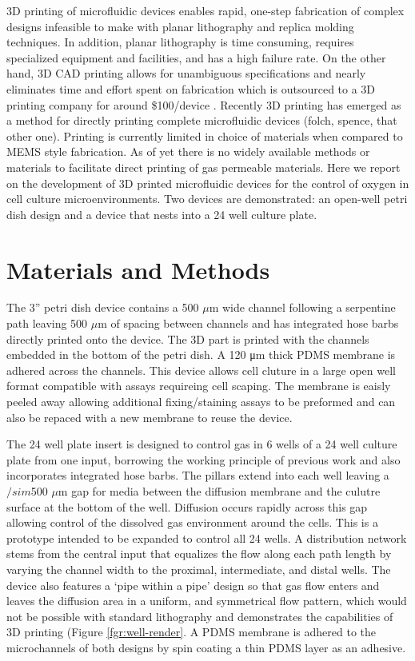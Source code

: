 3D printing of microfluidic devices enables rapid, one-step fabrication of complex designs infeasible to make with planar lithography and replica molding techniques.
In addition, planar lithography is time consuming, requires specialized equipment and facilities, and has a high failure rate.
On the other hand, 3D CAD printing allows for unambiguous specifications and nearly eliminates time and effort spent on fabrication which is outsourced to a 3D printing company for around \$100/device \cite{Au2014,Chen2014}.
Recently 3D printing has emerged as a method for directly printing complete microfluidic devices (folch, spence, that other one). 
Printing is currently limited in choice of materials when compared to MEMS style fabrication. 
As of yet there is no widely available methods or materials to facilitate direct printing of gas permeable materials.
Here we report on the development of 3D printed microfluidic devices for the control of oxygen in cell culture microenvironments.
Two devices are demonstrated: an open-well petri dish design and a device that nests into a 24 well culture plate.

\section*{Materials and Methods}

The 3” petri dish device contains a 500 $\mu$m wide channel following a serpentine path leaving 500 $\mu$m of spacing between channels and has integrated hose barbs directly printed onto the device.
The 3D part is printed with the channels embedded in the bottom of the petri dish. 
A 120 μm thick PDMS membrane is adhered across the channels.
This device allows cell cluture in a large open well format compatible with assays requireing cell scaping.
The membrane is eaisly peeled away allowing additional fixing/staining assays to be preformed and can also be repaced with a new membrane to reuse the device. 

The 24 well plate insert is designed to control gas in 6 wells of a 24 well culture plate from one input, borrowing the working principle of previous work\cite{oppegard2010} and also incorporates integrated hose barbs.
The pillars extend into each well leaving a $/sim$500 $\mu$m gap for media between the diffusion membrane and the culutre surface at the bottom of the well.
Diffusion occurs rapidly across this gap allowing control of the dissolved gas environment around the cells. 
This is a prototype intended to be expanded to control all 24 wells.
A distribution network stems from the central input that equalizes the flow along each path length by varying the channel width to the proximal, intermediate, and distal wells.
The device also features a ‘pipe within a pipe’ design so that gas flow enters and leaves the diffusion area in a uniform, and symmetrical flow pattern, which would not be possible with standard lithography and demonstrates the capabilities of 3D printing (Figure \ref{fgr:well-render}.
A PDMS membrane is adhered to the microchannels of both designs by spin coating a thin PDMS layer as an adhesive.


